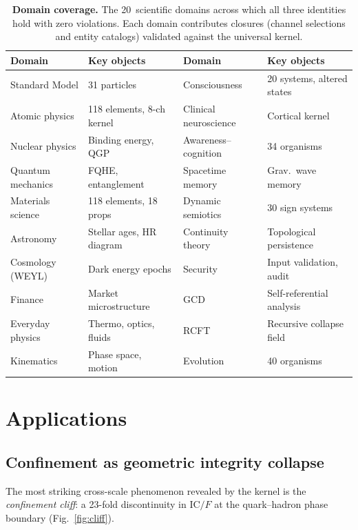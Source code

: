 \documentclass[11pt]{article}
\newcommand{\IC}{\mathrm{IC}}
\begin{document}
\begin{table}[!htbp]
\caption{\textbf{Domain coverage.} The 20~scientific domains
across which all three identities hold with zero violations.
Each domain contributes closures (channel selections and
entity catalogs) validated against the universal kernel.}
\label{tab:domains}
\begin{tabular}{llll}
\toprule
\textbf{Domain} & \textbf{Key objects}
& \textbf{Domain} & \textbf{Key objects} \\
\midrule
Standard Model & 31 particles &
  Consciousness & 20 systems, altered states \\
Atomic physics & 118 elements, 8-ch kernel &
  Clinical neuroscience & Cortical kernel \\
Nuclear physics & Binding energy, QGP &
  Awareness--cognition & 34 organisms \\
Quantum mechanics & FQHE, entanglement &
  Spacetime memory & Grav.\ wave memory \\
Materials science & 118 elements, 18 props &
  Dynamic semiotics & 30 sign systems \\
Astronomy & Stellar ages, HR diagram &
  Continuity theory & Topological persistence \\
Cosmology (WEYL) & Dark energy epochs &
  Security & Input validation, audit \\
Finance & Market microstructure &
  GCD & Self-referential analysis \\
Everyday physics & Thermo, optics, fluids &
  RCFT & Recursive collapse field \\
Kinematics & Phase space, motion &
  Evolution & 40 organisms \\
\bottomrule
\end{tabular}
\end{table}

\section{Applications}

\subsection{Confinement as geometric integrity collapse}

The most striking cross-scale phenomenon revealed by the kernel is the
\emph{confinement cliff}: a 23-fold discontinuity in $\IC/F$
at the quark--hadron phase boundary (Fig.~\ref{fig:cliff}).
\end{document}
